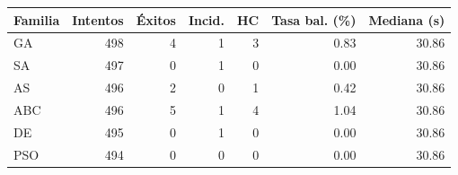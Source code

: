 \begin{tabularx}{\linewidth}{Yrrrrrr}
\toprule
Familia & Intentos & Éxitos & Incid. & HC & Tasa bal. (\%) & Mediana (s) \\ \midrule
GA & 498 & 4 & 1 & 3 & 0.83 & 30.86 \\
SA & 497 & 0 & 1 & 0 & 0.00 & 30.86 \\
AS & 496 & 2 & 0 & 1 & 0.42 & 30.86 \\
ABC & 496 & 5 & 1 & 4 & 1.04 & 30.86 \\
DE & 495 & 0 & 1 & 0 & 0.00 & 30.86 \\
PSO & 494 & 0 & 0 & 0 & 0.00 & 30.86 \\
\bottomrule\end{tabularx}
